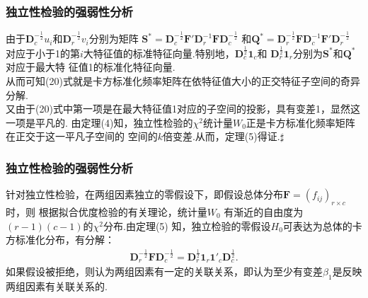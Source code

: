 \begin{frame}\frametitle{\color{blue}独立性检验的强弱性分析}
 \begin{footnotesize}
 \xiaowu
 \quad\quad 由于$\mathbf{D}^{-\frac{1}{2}}_{c}u_{i}$和$\mathbf{D}^{-\frac{1}{2}}_{r}v_{i}$分别为矩阵
$\mathbf{S}^{*}=\mathbf{D}^{-\frac{1}{2}}_{c}\mathbf{F}'\mathbf{D}^{-1}_{r}\mathbf{F}\mathbf{D}^{-\frac{1}{2}}_{c}$
和$\mathbf{Q}^{*}=\mathbf{D}^{-\frac{1}{2}}_{r}\mathbf{F}\mathbf{D}^{-1}_{c}\mathbf{F}'\mathbf{D}^{-\frac{1}{2}}_{r}$
对应于小于1的第$i$大特征值的标准特征向量.特别地，$\mathbf{D}^{\frac{1}{2}}_{c}\mathbf{1}_{c}$和
$\mathbf{D}^{\frac{1}{2}}_{r}\mathbf{1}_{r}$分别为$\mathbf{S}^{*}$和$\mathbf{Q}^{*}$对应于最大特
征值1的标准化特征向量.\\
\quad\quad 从而可知(20)式就是卡方标准化频率矩阵在依特征值大小的正交特征子空间的奇异分解.\\
\quad\quad 又由于(20)式中第一项是在最大特征值1对应的子空间的投影，具有变差1，显然这一项是平凡的.
由定理(4)知，独立性检验的$\chi^{2}$统计量$W_{0}$正是卡方标准化频率矩阵在正交于这一平凡子空间的
空间的$k$倍变差.从而，定理(5)得证.\quad $\sharp$
\end{footnotesize}
\end{frame}
\begin{frame}\frametitle{\color{blue}独立性检验的强弱性分析}
 \begin{footnotesize}
 \quad\quad 针对独立性检验，在两组因素独立的零假设下，即假设总体分布$\mathbf{F}=(f_{ij})_{r\times c}$时，则
根据拟合优度检验的有关理论，统计量$W_{0}$
有渐近的自由度为$(r-1)(c-1)$的$\chi^{2}$分布.由定理(5)
知，独立检验的零假设$H_{0}$可表达为总体的卡方标准化分布，有分解：
\begin{eqnarray}
     \mathbf{D}^{-\frac{1}{2}}_{r}\mathbf{F}\mathbf{D}^{-\frac{1}{2}}_{c}=
     \mathbf{D}^{\frac{1}{2}}_{r}\mathbf{1}_{r}\mathbf{1}'_{c}\mathbf{D}^{\frac{1}{2}}_{c}.
\end{eqnarray}
如果假设被拒绝，则认为两组因素有一定的关联关系，即认为至少有变差$\beta_{1}$是反映两组因素有关联关系的.\\
\end{footnotesize}
\end{frame}
